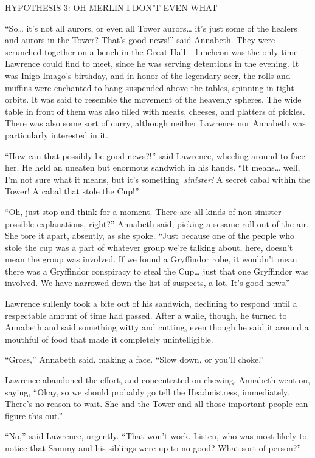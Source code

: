 HYPOTHESIS 3: OH MERLIN I DON'T EVEN WHAT

``So\ldots{} it's not all aurors, or even all Tower aurors\ldots{} it's
just some of the healers and aurors in the Tower? That's good news!''
said Annabeth. They were scrunched together on a bench in the Great Hall
-- luncheon was the only time Lawrence could find to meet, since he was
serving detentions in the evening. It was Inigo Imago's birthday, and in
honor of the legendary seer, the rolls and muffins were enchanted to
hang suspended above the tables, spinning in tight orbits. It was said
to resemble the movement of the heavenly spheres. The wide table in
front of them was also filled with meats, cheeses, and platters of
pickles. There was also some sort of curry, although neither Lawrence
nor Annabeth was particularly interested in it.

``How can that possibly be good news?!'' said Lawrence, wheeling around
to face her. He held an uneaten but enormous sandwich in his hands. ``It
means\ldots{} well, I'm not sure what it means, but it's
something~\emph{sinister!} A secret cabal within the Tower! A cabal that
stole the Cup!''

``Oh, just stop and think for a moment. There are all kinds of
non-sinister possible explanations, right?'' Annabeth said, picking a
sesame roll out of the air. She tore it apart, absently, as she spoke.
``Just because one of the people who stole the cup was a part of
whatever group we're talking about, here, doesn't mean the group was
involved. If we found a Gryffindor robe, it wouldn't mean there was a
Gryffindor conspiracy to steal the Cup\ldots{} just that one Gryffindor
was involved. We have narrowed down the list of suspects, a lot. It's
good news.''

Lawrence sullenly took a bite out of his sandwich, declining to respond
until a respectable amount of time had passed. After a while, though, he
turned to Annabeth and said something witty and cutting, even though he
said it around a mouthful of food that made it completely
unintelligible.

``Gross,'' Annabeth said, making a face. ``Slow down, or you'll choke.''

Lawrence abandoned the effort, and concentrated on chewing. Annabeth
went on, saying, ``Okay, so we should probably go tell the Headmistress,
immediately. There's no reason to wait. She and the Tower and all those
important people can figure this out.''

``No,'' said Lawrence, urgently. ``That won't work. Listen, who was most
likely to notice that Sammy and his siblings were up to no good? What
sort of person?''

